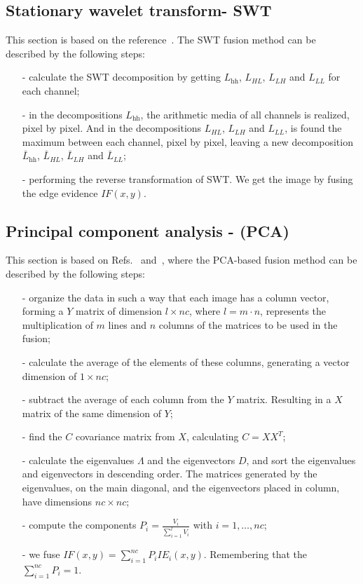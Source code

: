 \documentclass[conference]{IEEEtran}
\begin{document}
\subsection{Stationary wavelet transform- SWT} 
This section is based on the reference~\cite{n_r}. The SWT fusion method can be described by the following steps:
\begin{itemize}
\item[-] calculate the SWT decomposition by getting $L_\text{hh}$, $L_{HL}$, $L_{LH}$ and $L_{LL}$ for each channel;
\item[-] in the decompositions $L_\text{hh}$, the arithmetic media of all channels is realized, pixel by pixel. And in the decompositions $L_{HL}$, $L_{LH}$ and $L_{LL}$, is found the maximum between each channel, pixel by pixel, leaving a new decomposition $\bar{L}_\text{hh}$, $\bar{L}_{HL}$, $\bar{L}_{LH}$ and $\bar{L}_{LL}$;
\item[-] performing the reverse transformation of SWT. We get the image by fusing the edge evidence $IF(x,y)$.  
\end{itemize}

\subsection{Principal component analysis - (PCA) }
This section is based on Refs.~\cite{n_r} and~\cite{mit}, where the PCA-based fusion method can be described by the following steps:
\begin{itemize}
\item[-] organize the data in such a way that each image has a column vector, forming a $Y$ matrix of dimension $l\times nc$, where $l=m\cdot n$, represents the multiplication of $m$ lines and $n$ columns of the matrices to be used in the fusion;
\item[-] calculate the average of the elements of these columns, generating a vector dimension of $1\times nc$;
\item[-] subtract the average of each column from the $Y$ matrix. Resulting in a $X$ matrix of the same dimension of $Y$; 
\item[-] find the $C$ covariance matrix from $X$, calculating $C=XX^T$;
\item[-] calculate the eigenvalues $\Lambda$ and the eigenvectors $D$, and sort the eigenvalues and eigenvectors in descending order. The matrices generated by the eigenvalues, on the main diagonal, and the eigenvectors placed in column, have dimensions $nc\times nc$;
\item[-] compute the components $P_i=\frac{V_i}{\sum_{i=1}^l V_i}$ with $i=1,\dots,nc$;
\item[-] we fuse $IF(x,y)=\sum_{i=1}^{nc}P_iIE_i(x,y)$. Remembering that the $\sum_{i=1}^{nc}P_i=1$.
\end{itemize}
\end{document}
